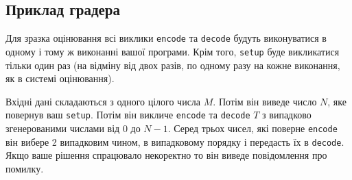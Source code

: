 \documentclass[12pt]{article}
\begin{document}
\subsection{Приклад градера}

Для зразка оцінювання всі виклики \texttt{encode} та \texttt{decode} будуть виконуватися в одному і тому ж виконанні вашої програми. Крім того, \texttt{setup} буде викликатися тільки один раз (на відміну від двох разів, по одному разу на кожне виконання, як в системі оцінювання).

Вхідні дані складаються з одного цілого числа $M$. Потім він виведе число $N$, яке повернув ваш \texttt{setup}.
Потім він викличе \texttt{encode} та \texttt{decode} $T$ з випадково згенерованими числами від $0$ до $N-1$. Серед трьох чисел, які поверне \texttt{encode} він вибере 2 випадковим чином, в випадковому порядку і передасть їх в \texttt{decode}. Якщо ваше рішення спрацювало некоректно то він виведе повідомлення про помилку.
\end{document}

